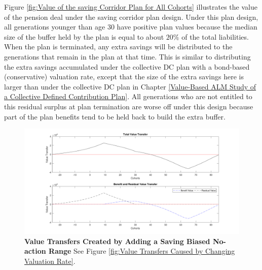 \documentclass{sfuthesis}
\numberwithin{equation}{chapter}
\begin{document}
		\justify
		Figure \ref{fig:Value of the saving Corridor Plan for All Cohorts} illustrates the  value of the pension deal under the saving corridor plan design. Under this plan design, all generations younger than age $30$ have positive plan values because the median size of the buffer held by the plan is equal to about $20\%$ of the total liabilities. When the plan is terminated, any extra savings will be distributed to the generations that remain in the plan at that time. This is similar to distributing the extra savings accumulated under the collective DC plan with a bond-based (conservative) valuation rate, except that the size of the extra savings here is larger than under the collective DC plan in Chapter \ref{Value-Based ALM Study of a Collective Defined Contribution Plan}. All generations who are not entitled to this residual surplus at plan termination are worse off under this design because part of the plan benefits tend to be held back to build the extra buffer. 

		\begin{figure}[h]
			\includegraphics[width=1\linewidth]{ResultPlot/Vtrans3.pdf} 
			\caption[Value Transfers Created by Adding a Saving Biased No-action Range]{\textbf{Value Transfers Created by Adding a Saving Biased No-action Range}
			\vspace{-0.4cm}
			\newline\footnotesize\justify See Figure \ref{fig:Value Transfers Caused by Changing Valuation Rate}.}
			\label{fig:Value Transfers Created by Adding a Saving Biased No-action Range}
		\end{figure}
\end{document}
